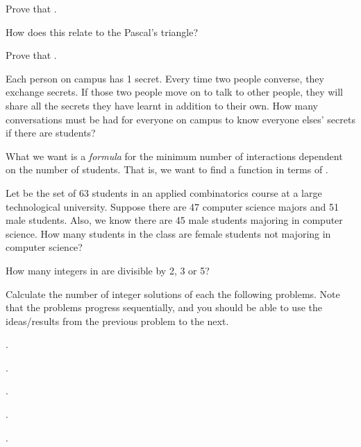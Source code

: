 \startchapter [title={Exercises}]

	\startsection [title={2019-06-12}]
		
		\startexercise [title={recursion formula for binomial coefficients}]
			Prove that .

			How does this relate to the Pascal's triangle?
		\stopexercise

		\startexercise [title={sum of binomial coefficients}]
			Prove that .
		\stopexercise
		
		\startexercise [title={variation of the handshake problem}]
			Each person on campus has 1 secret. Every time two people converse, they exchange secrets. If those two people move on to talk to other people, they will share all the secrets they have learnt in addition to their own. How many conversations must be had for everyone on campus to know everyone elses' secrets if there are  students?

			What we want is a \emph{formula} for the minimum number of interactions dependent on the number of students. That is, we want to find a function  in terms of .
		\stopexercise

		\startexercise [title={Venn diagrams}]
			Let  be the set of 63 students in an applied combinatorics course at a large technological university. Suppose there are 47 computer science majors and 51 male students. Also, we know there are 45 male students majoring in computer science. How many students in the class are female students not majoring in computer science?
		\stopexercise

		\startexercise [title={counting integers}]
			How many integers in  are divisible by 2, 3 or 5?
		\stopexercise

		\startexercise [title={stars and bars problems}]
			Calculate the number of integer solutions of each the following problems. Note that the problems progress sequentially, and you should be able to use the ideas/results from the previous problem to the next.
			\startitemize [m, joinedup]
				\item  {}.
				\item  {}.
				\item  {}.
				\item  {}.
				\item  {}.
			\stopitemize
		\stopexercise

	\stopsection


\stopchapter